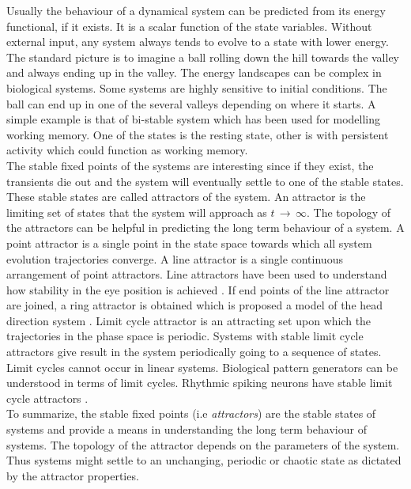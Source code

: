 Usually the behaviour of a dynamical system can be predicted from its energy functional, if it exists. It is a scalar function of the state variables. Without external input, any system always tends to evolve to a state with lower energy. The standard picture is to imagine a ball rolling down the hill towards the valley and always ending up in the valley. The energy landscapes can be complex in biological systems. Some systems are highly sensitive to initial conditions. The ball can end up in one of the several valleys depending on where it starts. A simple example is that of bi-stable system which has been used for modelling working memory. One of the states is the resting state, other is with persistent activity which could function as working memory.\\
The stable fixed points of the systems are interesting since if they exist, the transients die out and the system will eventually settle to one of the stable states. These stable states are called attractors of the system. An attractor is the limiting set of states that the system will approach as $t\, \rightarrow \, \infty $. The topology of the attractors can be helpful in predicting the long term behaviour of a system. A point attractor is a single point in the state space towards which all system evolution trajectories converge. A line attractor is a single continuous arrangement of point attractors. Line attractors have been used to understand how stability in the eye position is achieved \cite{Seung1996}. If end points of the line attractor are joined, a ring attractor is obtained which is proposed a model of the head direction system \cite{Zhang1996}. Limit cycle attractor is an attracting set upon which the trajectories in the phase space is periodic. Systems with stable limit cycle attractors give result in the system periodically going to a sequence of states. Limit cycles cannot occur in linear systems. Biological pattern generators can be understood in terms of limit cycles. Rhythmic spiking neurons have stable limit cycle attractors \cite{Izhikevich2007}.\\
To summarize, the stable fixed points (i.e \emph{attractors}) are the stable states of systems and provide a means in understanding the long term behaviour of systems. The topology of the attractor depends on the parameters of the system. Thus systems might settle to an unchanging, periodic or chaotic state as dictated by the attractor properties. 

